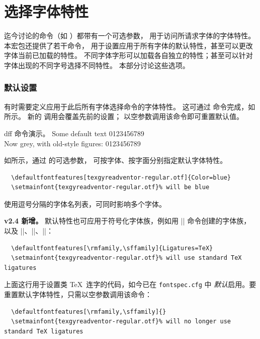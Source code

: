 \documentclass[a4paper]{l3doc}
\begin{document}
\part{选择字体特性}
\label{sec:selectingfeature}

迄今讨论的命令（如 ）都带有一个可选参数，
用于访问所请求字体的字体特性。本宏包还提供了若干命令，
用于设置应用于所有字体的默认特性，甚至可以更改字体当前已加载的特性。
不同字体字形可以加载各自独立的特性；甚至可以针对字体出现的不同字号选择不同特性。
本部分讨论这些选项。

\section{默认设置}
\label{sec:defaults}


有时需要定义应用于此后所有字体选择命令的字体特性。
这可通过  命令完成，如  所示。
新的  调用会覆盖先前的设置；
以空参数调用该命令即可重置默认值。

\begin{Xexample}{dff}{ 命令演示。}
  Some default text 0123456789 \\
  Now grey, with old-style figures:
  0123456789
\end{Xexample}


如所示，通过  的可选参数，
可按字体、按字面分别指定默认字体特性。
\begin{Verbatim}
  \defaultfontfeatures[texgyreadventor-regular.otf]{Color=blue}
  \setmainfont{texgyreadventor-regular.otf}% will be blue
\end{Verbatim}
使用逗号分隔的字体名列表，可同时影响多个字体。


\textbf{v2.4 新增。}
默认特性也可应用于符号化字体族，例如用 |\newfontfamily| 命令创建的字体族，
以及 |\rmfamily|、|\sffamily|、|\ttfamily|：
\begin{Verbatim}
  \defaultfontfeatures[\rmfamily,\sffamily]{Ligatures=TeX}
  \setmainfont{texgyreadventor-regular.otf}% will use standard TeX ligatures
\end{Verbatim}
上面这行用于设置类 \TeX\ 连字的代码，如今已在 \texttt{fontspec.cfg} 中
\emph{默认}启用。要重置默认字体特性，只需以空参数调用该命令：
\begin{Verbatim}
  \defaultfontfeatures[\rmfamily,\sffamily]{}
  \setmainfont{texgyreadventor-regular.otf}% will no longer use standard TeX ligatures
\end{Verbatim}
\end{document}
